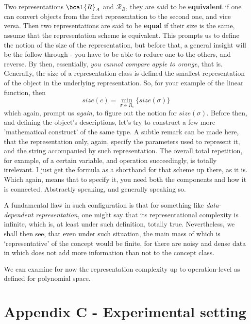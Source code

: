 \documentclass[10pt]{article} %
\begin{document}
Two representations $\bcal{R}_{A}$ and $\mathcal{R}_{B}$, they are said to be \textbf{equivalent} if one can convert objects from the first representation to the second one, and vice versa. Then two representations are said to be \textbf{equal} if their size is the same, assume that the representation scheme is equivalent. This prompts us to define the notion of the size of the representation, but before that, a general insight will be the follow through - you have to be able to reduce one to the others, and reverse. By then, essentially, \textit{you cannot compare apple to orange}, that is. Generally, the size of a representation class is defined the smallest representation of the object in the underlying representation. So, for your example of the linear function, then 
\begin{equation}
    size(c)=\min_{\sigma \in R_{c}}\{size(\sigma)\}
\end{equation}
which again, prompt us \textit{again}, to figure out the notion for $size(\sigma)$. Before then, and defining the object's descriptions, let's try to construct a few more 'mathematical construct' of the same type. A subtle remark can be made here, that the representation only, again, specify the parameters used to represent it, and the string accompanied by such representation. The overall total repetition, for example, of a certain variable, and operation succeedingly, is totally irrelevant. I just get the formula as a shorthand for that scheme up there, as it is. Which again, means that to specify it, you need both the components and how it is connected. Abstractly speaking, and generally speaking so. 

A fundamental flaw in such configuration is that for something like \textit{data-dependent representation}, one might say that its representational complexity is infinite, which is, at least under such definition, totally true. Nevertheless, we shall then see, that even under such situation, the main mass of which is `representative' of the concept would be finite, for there are noisy and dense data in which does not add more information than not to the concept class. 

We can examine for now the representation complexity up to operation-level as defined for polynomial space. 

\section*{Appendix C - Experimental setting}
\end{document}
